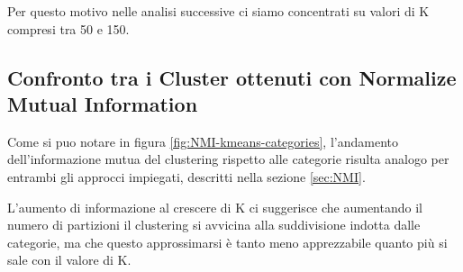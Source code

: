 \documentclass[
	11pt, %
	a4paper, %
	oneside, %
	headinclude,footinclude, %
	BCOR5mm, %
]{scrartcl}
\begin{document}
	Per questo motivo nelle analisi successive ci siamo concentrati su valori di K compresi tra 50 e 150.

	\subsection{Confronto tra i Cluster ottenuti con Normalize Mutual Information}
		Come si puo notare in figura \ref{fig:NMI-kmeans-categories}, l'andamento dell'informazione mutua del clustering rispetto alle categorie risulta analogo per entrambi gli approcci impiegati, descritti nella sezione \ref{sec:NMI}.

		L'aumento di informazione al crescere di K ci suggerisce che aumentando il numero di partizioni il clustering si avvicina alla suddivisione indotta dalle categorie, ma che questo approssimarsi è tanto meno apprezzabile quanto più si sale con il valore di K.
\end{document}
